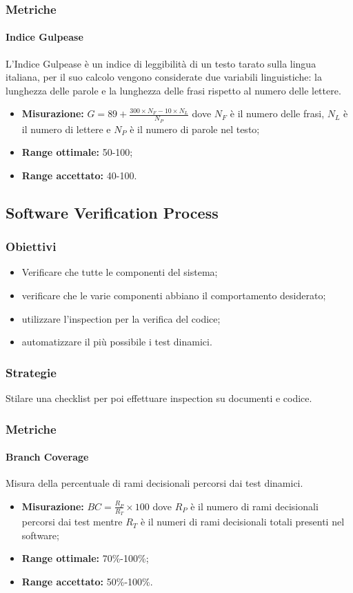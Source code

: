		\subsubsection{Metriche}
			\paragraph{Indice Gulpease}
			L'Indice Gulpease è un indice di leggibilità di un testo tarato sulla lingua italiana, per il suo calcolo vengono considerate due variabili linguistiche: la lunghezza delle parole e la lunghezza delle frasi rispetto al numero delle lettere.
			\begin{itemize}
				\item \textbf{Misurazione:} $G=89+\frac{300\times N_F-10\times N_L}{N_P}$ dove $N_F$ è il numero delle frasi, $N_L$ è il numero di lettere e $N_P$ è il numero di parole nel testo;
				\item \textbf{Range ottimale:} 50-100;
				\item \textbf{Range accettato:} 40-100.
			\end{itemize}

	\subsection{Software Verification Process}
		\subsubsection{Obiettivi}
		\begin{itemize}
			\item Verificare che tutte le componenti del sistema;
			\item verificare che le varie componenti abbiano il comportamento desiderato;
			\item utilizzare l'inspection per la verifica del codice;
			\item automatizzare il più possibile i test dinamici.
		\end{itemize}
		\subsubsection{Strategie}
		Stilare una checklist per poi effettuare inspection su documenti e codice.
		\subsubsection{Metriche}
			\paragraph{Branch Coverage} 
			Misura della percentuale di rami decisionali percorsi dai test dinamici.
			\begin{itemize}
			\item \textbf{Misurazione:} $BC=\frac{R_P}{R_T}\times 100$ dove $R_P$ è il numero di rami decisionali percorsi dai test mentre $R_T$ è il numeri di rami decisionali totali presenti nel software;
			\item \textbf{Range ottimale:} 70\%-100\%;
			\item \textbf{Range accettato:} 50\%-100\%.
		    \end{itemize}
